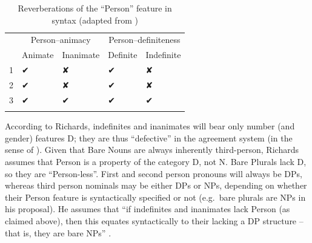 \documentclass[output=paper]{langsci/langscibook}
\begin{document}
\begin{table}
\begin{tabularx}{\textwidth}{XXXXX}
\lsptoprule
& \multicolumn{2}{c}{Person--animacy} & \multicolumn{2}{c}{Person--definiteness}\\
   & Animate & Inanimate & Definite & Indefinite\\
\midrule
1  & ✔       & ✘         & ✔        & ✘\\
2  & ✔       & ✘         & ✔        & ✘\\
3  & ✔       & ✔         & ✔        & ✔\\
\lspbottomrule
\end{tabularx}
\caption{Reverberations of the \enquote{Person} feature in syntax (adapted from
\citealt{Richards2008})}\label{tab:key:27.27.1}
\end{table}

According to Richards, indefinites and inanimates will bear only number (and
gender) features D; they are thus \enquote{defective} in the agreement system
(in the sense of \citealt{Chomsky2001}). Given that Bare Nouns are always
inherently third-person, Richards assumes that Person is a property of the
category D, not N. Bare Plurals lack D, so they are \enquote{Person-less}.
First and second person pronouns will always be DPs,
whereas third person nominals may be either DPs or NPs,
depending on whether their Person feature is syntactically specified or not
(e.g.\ bare plurals are NPs in his proposal). He assumes that ``if indefinites
and inanimates lack Person (as claimed above), then this equates syntactically
to their lacking a DP structure -- that is, they are bare NPs''
\citep[140]{Richards2008}.
\end{document}
